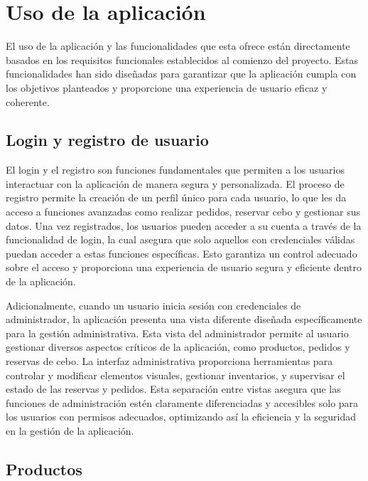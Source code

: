 \section{Uso de la aplicación}\label{sec:apartado}

El uso de la aplicación y las funcionalidades que esta ofrece están directamente basados en los requisitos funcionales establecidos al comienzo del proyecto. Estas funcionalidades han sido diseñadas para garantizar que la aplicación cumpla con los objetivos planteados y proporcione una experiencia de usuario eficaz y coherente.

\subsection{Login y registro de usuario}\label{subsec5.2.1}
    
El login y el registro son funciones fundamentales que permiten a los usuarios interactuar con la aplicación de manera segura y personalizada. El proceso de registro permite la creación de un perfil único para cada usuario, lo que les da acceso a funciones avanzadas como realizar pedidos, reservar cebo y gestionar sus datos. Una vez registrados, los usuarios pueden acceder a su cuenta a través de la funcionalidad de login, la cual asegura que solo aquellos con credenciales válidas puedan acceder a estas funciones específicas. Esto garantiza un control adecuado sobre el acceso y proporciona una experiencia de usuario segura y eficiente dentro de la aplicación.

\vspace{0.5cm}

Adicionalmente, cuando un usuario inicia sesión con credenciales de administrador, la aplicación presenta una vista diferente diseñada específicamente para la gestión administrativa. Esta vista del administrador permite al usuario gestionar diversos aspectos críticos de la aplicación, como productos, pedidos y reservas de cebo. La interfaz administrativa proporciona herramientas para controlar y modificar elementos visuales, gestionar inventarios, y supervisar el estado de las reservas y pedidos. Esta separación entre vistas asegura que las funciones de administración estén claramente diferenciadas y accesibles solo para los usuarios con permisos adecuados, optimizando así la eficiencia y la seguridad en la gestión de la aplicación.

\subsection{Productos}\label{subsec5.2.2}

